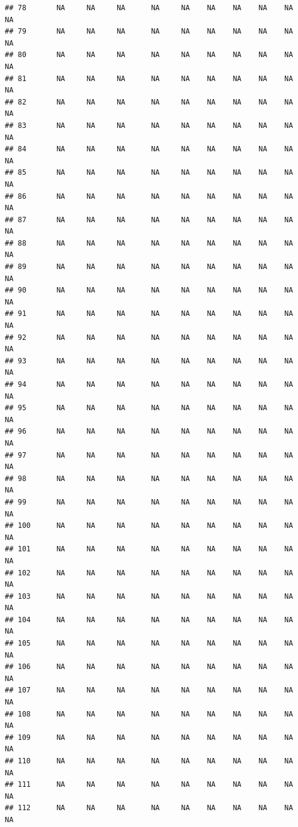 \documentclass{article}\usepackage{graphicx, color}
\makeatletter
\newenvironment{kframe}{%
 \def\at@end@of@kframe{}%
 \ifinner\ifhmode%
  \def\at@end@of@kframe{\end{minipage}}%
  \begin{minipage}{\columnwidth}%
 \fi\fi%
 \def\FrameCommand##1{\hskip\@totalleftmargin \hskip-\fboxsep
 \colorbox{shadecolor}{##1}\hskip-\fboxsep
     \hskip-\linewidth \hskip-\@totalleftmargin \hskip\columnwidth}%
 \MakeFramed {\advance\hsize-\width
   \@totalleftmargin\z@ \linewidth\hsize
   \@setminipage}}%
 {\par\unskip\endMakeFramed%
 \at@end@of@kframe}
\newenvironment{knitrout}{}{} %
\makeatother
\begin{document}
\begin{knitrout}
\begin{kframe}
\begin{verbatim}
## 78       NA     NA     NA      NA     NA    NA    NA    NA    NA     NA
## 79       NA     NA     NA      NA     NA    NA    NA    NA    NA     NA
## 80       NA     NA     NA      NA     NA    NA    NA    NA    NA     NA
## 81       NA     NA     NA      NA     NA    NA    NA    NA    NA     NA
## 82       NA     NA     NA      NA     NA    NA    NA    NA    NA     NA
## 83       NA     NA     NA      NA     NA    NA    NA    NA    NA     NA
## 84       NA     NA     NA      NA     NA    NA    NA    NA    NA     NA
## 85       NA     NA     NA      NA     NA    NA    NA    NA    NA     NA
## 86       NA     NA     NA      NA     NA    NA    NA    NA    NA     NA
## 87       NA     NA     NA      NA     NA    NA    NA    NA    NA     NA
## 88       NA     NA     NA      NA     NA    NA    NA    NA    NA     NA
## 89       NA     NA     NA      NA     NA    NA    NA    NA    NA     NA
## 90       NA     NA     NA      NA     NA    NA    NA    NA    NA     NA
## 91       NA     NA     NA      NA     NA    NA    NA    NA    NA     NA
## 92       NA     NA     NA      NA     NA    NA    NA    NA    NA     NA
## 93       NA     NA     NA      NA     NA    NA    NA    NA    NA     NA
## 94       NA     NA     NA      NA     NA    NA    NA    NA    NA     NA
## 95       NA     NA     NA      NA     NA    NA    NA    NA    NA     NA
## 96       NA     NA     NA      NA     NA    NA    NA    NA    NA     NA
## 97       NA     NA     NA      NA     NA    NA    NA    NA    NA     NA
## 98       NA     NA     NA      NA     NA    NA    NA    NA    NA     NA
## 99       NA     NA     NA      NA     NA    NA    NA    NA    NA     NA
## 100      NA     NA     NA      NA     NA    NA    NA    NA    NA     NA
## 101      NA     NA     NA      NA     NA    NA    NA    NA    NA     NA
## 102      NA     NA     NA      NA     NA    NA    NA    NA    NA     NA
## 103      NA     NA     NA      NA     NA    NA    NA    NA    NA     NA
## 104      NA     NA     NA      NA     NA    NA    NA    NA    NA     NA
## 105      NA     NA     NA      NA     NA    NA    NA    NA    NA     NA
## 106      NA     NA     NA      NA     NA    NA    NA    NA    NA     NA
## 107      NA     NA     NA      NA     NA    NA    NA    NA    NA     NA
## 108      NA     NA     NA      NA     NA    NA    NA    NA    NA     NA
## 109      NA     NA     NA      NA     NA    NA    NA    NA    NA     NA
## 110      NA     NA     NA      NA     NA    NA    NA    NA    NA     NA
## 111      NA     NA     NA      NA     NA    NA    NA    NA    NA     NA
## 112      NA     NA     NA      NA     NA    NA    NA    NA    NA     NA

\end{verbatim}
\end{kframe}
\end{knitrout}
\end{document}
